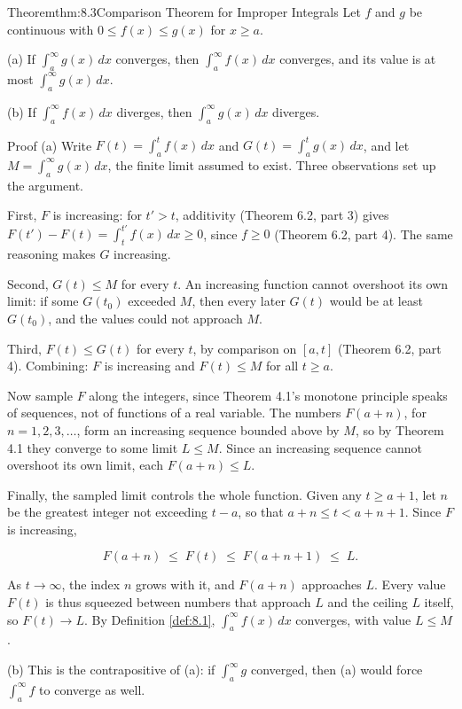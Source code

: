 \documentclass[a4paper,12pt,oneside]{memoir}
\begin{document}
\begin{envtheorem}{Theorem}{thm:8.3}{Comparison Theorem for Improper Integrals}
Let \(f\) and \(g\) be continuous with \(0 \le f(x) \le g(x)\) for \(x \ge a\).

(a) If \(\displaystyle\int_{a}^{\infty} g(x)\,dx\) converges, then \(\displaystyle\int_{a}^{\infty} f(x)\,dx\) converges, and its value is at most \(\displaystyle\int_{a}^{\infty} g(x)\,dx\).

(b) If \(\displaystyle\int_{a}^{\infty} f(x)\,dx\) diverges, then \(\displaystyle\int_{a}^{\infty} g(x)\,dx\) diverges.
\end{envtheorem}
\begin{envproof}{Proof}{}{}
(a) Write \(F(t) = \int_{a}^{t} f(x)\,dx\) and \(G(t) = \int_{a}^{t} g(x)\,dx\), and let \(M = \int_{a}^{\infty} g(x)\,dx\), the finite limit assumed to exist. Three observations set up the argument.

First, \(F\) is increasing: for \(t' > t\), additivity (Theorem 6.2, part 3) gives \(F(t') - F(t) = \int_{t}^{t'} f(x)\,dx \ge 0\), since \(f \ge 0\) (Theorem 6.2, part 4). The same reasoning makes \(G\) increasing.

Second, \(G(t) \le M\) for every \(t\). An increasing function cannot overshoot its own limit: if some \(G(t_{0})\) exceeded \(M\), then every later \(G(t)\) would be at least \(G(t_{0})\), and the values could not approach \(M\).

Third, \(F(t) \le G(t)\) for every \(t\), by comparison on \([a, t]\) (Theorem 6.2, part 4). Combining: \(F\) is increasing and \(F(t) \le M\) for all \(t \ge a\).

Now sample \(F\) along the integers, since Theorem 4.1’s monotone principle speaks of sequences, not of functions of a real variable. The numbers \(F(a + n)\), for \(n = 1, 2, 3, \dots\), form an increasing sequence bounded above by \(M\), so by Theorem 4.1 they converge to some limit \(L \le M\). Since an increasing sequence cannot overshoot its own limit, each \(F(a + n) \le L\).

Finally, the sampled limit controls the whole function. Given any \(t \ge a + 1\), let \(n\) be the greatest integer not exceeding \(t - a\), so that \(a + n \le t < a + n + 1\). Since \(F\) is increasing,

\[ F(a + n) \;\le\; F(t) \;\le\; F(a + n + 1) \;\le\; L. \]

As \(t \to \infty\), the index \(n\) grows with it, and \(F(a + n)\) approaches \(L\). Every value \(F(t)\) is thus squeezed between numbers that approach \(L\) and the ceiling \(L\) itself, so \(F(t) \to L\). By Definition \ref{def:8.1}, \(\int_{a}^{\infty} f(x)\,dx\) converges, with value \(L \le M\).

(b) This is the contrapositive of (a): if \(\int_{a}^{\infty} g\) converged, then (a) would force \(\int_{a}^{\infty} f\) to converge as well. \qedmark
\end{envproof}
\end{document}
